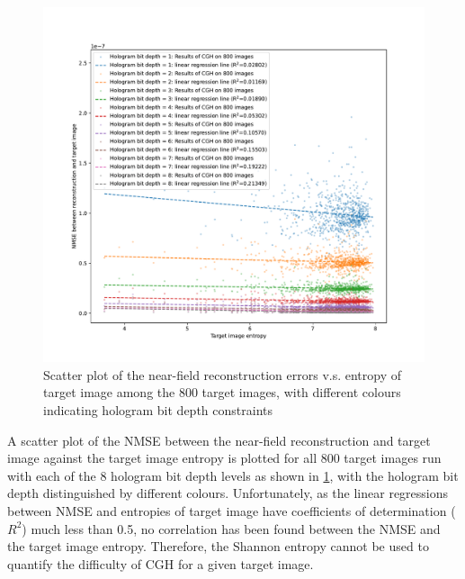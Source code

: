	\begin{figure} [H]
		\begin{center}
		\includegraphics[trim={50 40 70 70}, clip, width = \textwidth]{GS_Fresnel0.1_NMSE_VS_Entropy.pdf}
		\end{center}
		\caption{\label{fig:GS_Fresnel0.1_NMSE_VS_Entropy} Scatter plot of the near-field reconstruction errors v.s. entropy of target image among the 800 target images, with different colours indicating hologram bit depth constraints}
	\end{figure}

	A scatter plot of the NMSE between the near-field reconstruction and target image against the target image entropy is plotted for all 800 target images run with each of the 8 hologram bit depth levels as shown in \cref{fig:GS_Fresnel0.1_NMSE_VS_Entropy}, with the hologram bit depth distinguished by different colours.
	Unfortunately, as the linear regressions between NMSE and entropies of target image have coefficients of determination ($R^2$) much less than 0.5, no correlation has been found between the NMSE and the target image entropy. Therefore, the Shannon entropy cannot be used to quantify the difficulty of CGH for a given target image.


